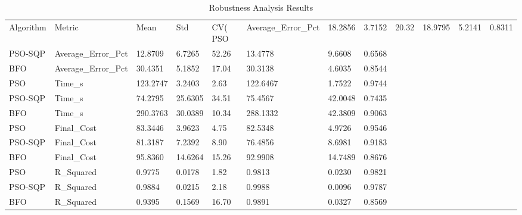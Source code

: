 \begin{table}
\caption{Robustness Analysis Results}
\label{tab:robustness_analysis}
\begin{tabular}{llllllll}
\toprule
Algorithm & Metric & Mean & Std & CV(%
\midrule
PSO & Average_Error_Pct & 18.2856 & 3.7152 & 20.32 & 18.9795 & 5.2141 & 0.8311 \\
PSO-SQP & Average_Error_Pct & 12.8709 & 6.7265 & 52.26 & 13.4778 & 9.6608 & 0.6568 \\
BFO & Average_Error_Pct & 30.4351 & 5.1852 & 17.04 & 30.3138 & 4.6035 & 0.8544 \\
PSO & Time_s & 123.2747 & 3.2403 & 2.63 & 122.6467 & 1.7522 & 0.9744 \\
PSO-SQP & Time_s & 74.2795 & 25.6305 & 34.51 & 75.4567 & 42.0048 & 0.7435 \\
BFO & Time_s & 290.3763 & 30.0389 & 10.34 & 288.1332 & 42.3809 & 0.9063 \\
PSO & Final_Cost & 83.3446 & 3.9623 & 4.75 & 82.5348 & 4.9726 & 0.9546 \\
PSO-SQP & Final_Cost & 81.3187 & 7.2392 & 8.90 & 76.4856 & 8.6981 & 0.9183 \\
BFO & Final_Cost & 95.8360 & 14.6264 & 15.26 & 92.9908 & 14.7489 & 0.8676 \\
PSO & R_Squared & 0.9775 & 0.0178 & 1.82 & 0.9813 & 0.0230 & 0.9821 \\
PSO-SQP & R_Squared & 0.9884 & 0.0215 & 2.18 & 0.9988 & 0.0096 & 0.9787 \\
BFO & R_Squared & 0.9395 & 0.1569 & 16.70 & 0.9891 & 0.0327 & 0.8569 \\
\bottomrule
\end{tabular}
\end{table}
